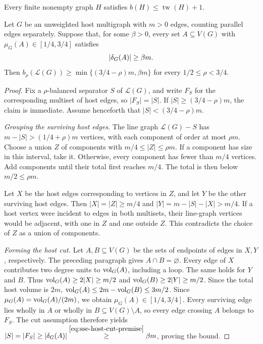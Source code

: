 \begin{lemma}
\label{lem:treewidth-balanced-separator}
Every finite nonempty graph $H$ satisfies
$b(H)\leq\operatorname{tw}(H)+1$.
\end{lemma}

\begin{lemma}
\label{lem:linegraph-separators}
Let $G$ be an unweighted host multigraph with $m>0$ edges, counting
parallel edges separately.
Suppose that, for some $\beta>0$, every set $A\subseteq V(G)$ with
$\mu_G(A)\in[1/4,3/4]$ satisfies
\begin{equation}\label{eq:sse-host-cut-premise}
 |\delta_G(A)|\geq\beta m.
\end{equation}
Then $b_\rho(\mathcal{L}(G))\geq\min\{(3/4-\rho)m,\beta m\}$
for every $1/2\leq\rho<3/4$.
\end{lemma}

\begin{proof}
Fix a $\rho$-balanced separator $S$ of $\mathcal L(G)$, and write
$F_S$ for the corresponding multiset of host edges, so $|F_S|=|S|$.
If $|S|\ge(3/4-\rho)m$, the claim is immediate. Assume henceforth
that $|S|<(3/4-\rho)m$.

\emph{Grouping the surviving host edges.}
The line graph $\mathcal L(G)-S$ has
$m-|S|>(1/4+\rho)m$ vertices, with each component of order at
most $\rho m$. Choose a union $Z$ of components with
$m/4\le|Z|\le\rho m$. If a component has size in this interval,
take it. Otherwise, every component has fewer than $m/4$ vertices.
Add components until their total first reaches $m/4$.
The total is then below $m/2\le\rho m$.

Let $X$ be the host edges corresponding to vertices in $Z$, and
let $Y$ be the other surviving host edges. Then
$|X|=|Z|\ge m/4$ and
$|Y|=m-|S|-|X|>m/4$.
If a host vertex were incident to edges in both multisets, their
line-graph vertices would be adjacent, with one in $Z$ and one
outside $Z$. This contradicts the choice of $Z$ as a union of
components.

\emph{Forming the host cut.}
Let $A,B\subseteq V(G)$ be the sets of endpoints of edges in
$X,Y$, respectively. The preceding paragraph gives
$A\cap B=\varnothing$. Every edge of $X$
contributes two degree units to $\operatorname{vol}_G(A)$, including a loop.
The same holds for $Y$ and $B$. Thus
$\operatorname{vol}_G(A)\ge2|X|\ge m/2$ and
$\operatorname{vol}_G(B)\ge2|Y|\ge m/2$.
Since the total host volume is $2m$,
$\operatorname{vol}_G(A)\le2m-\operatorname{vol}_G(B)\le3m/2$.
Since $\mu_G(A)=\operatorname{vol}_G(A)/(2m)$, we obtain
$\mu_G(A)\in[1/4,3/4]$.
Every surviving edge lies wholly in $A$ or wholly in
$B\subseteq V(G)\setminus A$, so every edge crossing $A$ belongs
to $F_S$. The cut assumption therefore yields
$|S|=|F_S|\ge|\delta_G(A)|
\overset{\eqref{eq:sse-host-cut-premise}}{\ge}\beta m$, proving the bound.
\end{proof}

